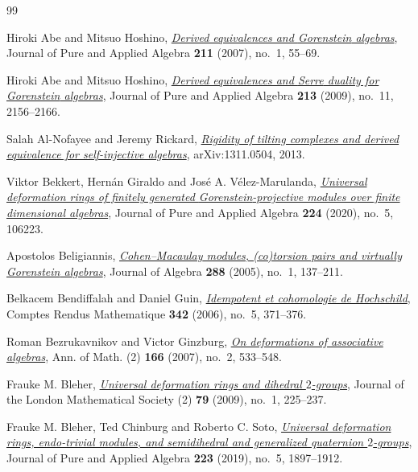 \documentclass[12pt,a4paper,english,reqno]{amsart}
\numberwithin{equation}{section}
\theoremstyle{plain}
\theoremstyle{definition}
\begin{document}
\begin{thebibliography}{99}

Hiroki Abe and Mitsuo Hoshino,
  \emph{\href{https://doi.org/10.1016/j.jpaa.2006.12.008}{Derived equivalences
  and {Gorenstein} algebras}}, Journal of Pure and Applied Algebra \textbf{211}
  (2007), no.~1, 55--69.

Hiroki Abe and Mitsuo Hoshino, \emph{\href{https://doi.org/10.1016/j.jpaa.2009.03.008}{Derived
  equivalences and {Serre} duality for {Gorenstein} algebras}}, Journal of Pure
  and Applied Algebra \textbf{213} (2009), no.~11, 2156--2166.

Salah Al-Nofayee and Jeremy Rickard,
  \emph{\href{https://arxiv.org/abs/1311.0504}{Rigidity of tilting
  complexes and derived equivalence for self-injective algebras}},
  arXiv:1311.0504, 2013.

Viktor Bekkert, Hern\'an Giraldo and Jos\'e A. V\'elez-Marulanda,
  \emph{\href{https://doi.org/10.1016/j.jpaa.2019.106223}{Universal
  deformation rings of finitely generated {Gorenstein}-projective
  modules over finite dimensional algebras}},
  Journal of Pure and Applied Algebra \textbf{224} (2020), no.~5, 106223.

Apostolos Beligiannis,
  \emph{\href{https://doi.org/10.1016/j.jalgebra.2005.02.022}{{Cohen--Macaulay}
  modules, (co)torsion pairs and virtually {Gorenstein} algebras}}, Journal of
  Algebra \textbf{288} (2005), no.~1, 137--211.

Belkacem Bendiffalah and Daniel Guin,
  \emph{\href{https://doi.org/10.1016/j.crma.2006.01.003}{Idempotent et
  cohomologie de {Hochschild}}}, Comptes Rendus Mathematique \textbf{342}
  (2006), no.~5, 371--376.

Roman Bezrukavnikov and Victor Ginzburg,
\emph{\href{https://doi.org/10.4007/annals.2007.166.533}{On deformations of associative algebras}},
Ann. of Math. (2) \textbf{166} (2007), no.~2, 533--548.

Frauke M. Bleher, \emph{\href{https://doi.org/10.1112/jlms/jdn071}
  {Universal deformation rings and dihedral $2$-groups}},
  Journal of the London Mathematical Society (2) \textbf{79} (2009),
  no.~1, 225--237.

Frauke M. Bleher, Ted Chinburg and Roberto C. Soto,
  \emph{\href{https://doi.org/10.1016/j.jpaa.2018.08.006}
  {Universal deformation rings, endo-trivial modules, and semidihedral
   and generalized quaternion $2$-groups}},
  Journal of Pure and Applied Algebra \textbf{223} (2019), no.~5, 1897--1912.


\end{thebibliography}
\end{document}

